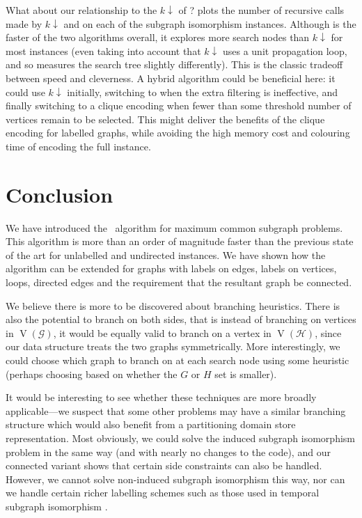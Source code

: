 \documentclass[letterpaper]{article}
\newcommand{\citet}[1]{\citeauthor{#1} \shortcite{#1}}
\newcommand{\citep}[1]{\cite{#1}}
\newcommand{\McSplit}{\textproc{McSplit}}
\newcommand{\graphG}{\mathcal{G}}
\newcommand{\graphH}{\mathcal{H}}
\newcommand{\setG}{G}
\newcommand{\setH}{H}
\DeclareMathOperator{\V}{V}
\begin{document}
What about our relationship to the $k{\downarrow}$ of
\citet{UpcomingAAAIPaper}?   plots the number of
recursive calls made by $k{\downarrow}$ and \McSplit{$\downarrow$} on each of the subgraph
isomorphism instances. Although \McSplit{$\downarrow$} is the faster of the two algorithms overall, it
explores more search nodes than $k{\downarrow}$ for most instances (even taking
into account that $k{\downarrow}$ uses a unit propagation loop, and so measures
the search tree slightly differently). This is the classic tradeoff between
speed and cleverness. A hybrid algorithm could be beneficial here: it could use
$k{\downarrow}$ initially, switching to \McSplit{$\downarrow$} when the extra filtering is
ineffective, and finally switching to a clique encoding when fewer than some
threshold number of vertices remain to be selected. This might deliver the
benefits of the clique encoding for labelled graphs, while avoiding the high
memory cost and colouring time of encoding the full instance.

\section{Conclusion}

We have introduced the \McSplit\ algorithm for maximum common subgraph
problems.  This algorithm is more than an order of magnitude faster than the
previous state of the art for unlabelled and undirected instances. We have
shown how the algorithm can be extended for graphs with labels on edges, labels
on vertices, loops, directed edges and the requirement that the resultant graph
be connected.

We believe there is more to be discovered about branching heuristics. There is
also the potential to branch on both sides, that is instead of branching on
vertices in $\V(\graphG)$, it would be equally valid to branch on a vertex in
$\V(\graphH)$, since our data structure treats the two graphs symmetrically. More
interestingly, we could choose which graph to branch on at each search node
using some heuristic (perhaps choosing based on whether the $\setG$ or $\setH$ set is
smaller).

It would be interesting to see whether these techniques are more broadly
applicable---we suspect that some other problems may have a similar branching
structure which would also benefit from a partitioning domain store
representation. Most obviously, we could solve the induced subgraph isomorphism
problem in the same way (and with nearly no changes to the code), and our
connected variant shows that certain side constraints can also be handled.
However, we cannot solve non-induced subgraph isomorphism this way, nor can
we handle certain richer labelling schemes such as those used in temporal
subgraph isomorphism \citep{DBLP:conf/asunam/RedmondC13}.



\end{document}

